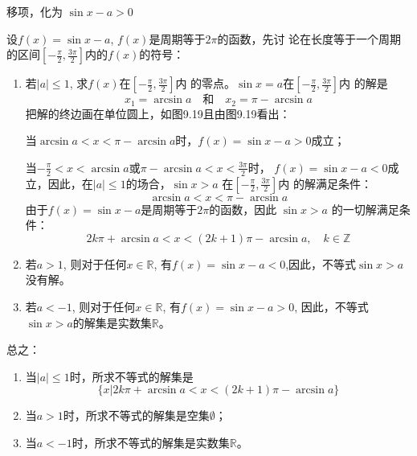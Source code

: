 \begin{solution}
    移项，化为
    $\sin x-a>0$

    设$f(x)=\sin x-a$, $f(x)$是周期等于$2\pi$的函数，先讨
    论在长度等于一个周期的区间$\left[-\frac{\pi}{2}, \frac{3\pi}{2}\right]$内的$f(x)$的符号：
\begin{enumerate}
    \item 若$|a|\le 1$, 求$f(x)$在$\left[-\frac{\pi}{2}, \frac{3\pi}{2}\right]$内
    的零点。$\sin x=a$在$\left[-\frac{\pi}{2}, \frac{3\pi}{2}\right]$内
    的解是
    \[    x_1=\arcsin a \quad \text{和}\quad x_2=\pi-\arcsin a\]
    把解的终边画在单位圆上，如图9.19且由图9.19看出：
\begin{figure}[htp]
    \centering
{}
    \caption{}
\end{figure}

    当$\arcsin a<x<\pi-\arcsin a$时，$f(x)=\sin x-a>0$成立；

    当$-\frac{\pi}{2}<x<\arcsin a$或$\pi-\arcsin a<x<\frac{3\pi}{2}$时，
    $f(x)=\sin x-a<0$成立，因此，在$|a|\le 1$的场合，$\sin x>a$
    在$\left[-\frac{\pi}{2}, \frac{3\pi}{2}\right]$内
    的解满足条件：
\[    \arcsin a<x<\pi-\arcsin a\]
由于$f(x)=\sin x-a$是周期等于$2\pi$的函数，因此
$\sin x>a$
的一切解满足条件：
\[2k\pi+\arcsin a<x<(2k+1)\pi-\arcsin a,\quad k\in\mathbb{Z}\]
\item  若$a>1$, 则对于任何$x\in\mathbb{R}$, 有$f(x)=\sin x-a<0$,因此，不等式$\sin x>a$没有解。
\item 若$a<-1$, 则对于任何$x\in\mathbb{R}$, 有$f(x)=\sin x-a>0$,
因此，不等式$\sin x>a$的解集是实数集$\mathbb{R}$。
\end{enumerate}

总之：
\begin{enumerate}
\item 当$|a|\le 1$时，所求不等式的解集是$$\{x|2k\pi+
\arcsin a<x<(2k+1)\pi-\arcsin a\}$$
\item 当$a>1$时，所求不等式的解集是空集$\emptyset$；
\item 当$a<-1$时，所求不等式的解集是实数集$\mathbb{R}$。
\end{enumerate}
\end{solution}


